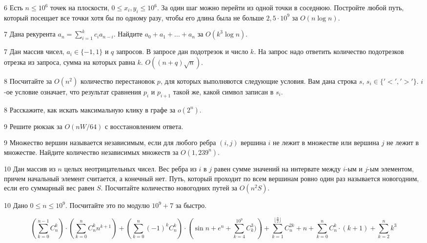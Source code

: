 \documentclass{article}
\begin{document}
\begin{tasks}
		\item[6] Есть $n \leq 10^6$ точек на плоскости, $0 \leq x_i, y_i \leq 10^6$. За один шаг можно перейти из одной точки в соседнюю. Постройте любой путь, который посещает все точки хотя бы по одному разу, чтобы его длина была не больше $2,5 \cdot 10^9$ за $O(n \log n)$.

		\item[7] Дана рекурента $a_n = \sum_{i=1}^{k} c_i a_{n - i}$. Найдите $a_0 + a_1 + ... + a_n$ за $O(k^3 \log n)$.

		\item[7] Дан массив чисел, $a_i \in \{-1, 1 \}$ и $q$ запросов. В запросе дан подотрезок и число $k$. На запрос надо ответить количество подотрезков отрезка из запроса, сумма на которых равна $k$. $O((n + q) \sqrt n)$.

		\item[8] Посчитайте за $O(n^2)$ количество перестановок $p$, для которых выполняются следующие условия. Вам дана строка $s$, $s_i \in \{ '<', '>' \}$. $i$-ое условие означает, что результат сравнения $p_i$ и $p_{i +1}$ такой же, какой символ записан в $s_i$.

		\item[8] Расскажите, как искать максимальную клику в графе за $o(2^n)$.

		\item[9] Решите рюкзак за $O(nW / 64)$ с восстановлением ответа.
		
		\item[9] Множество вершин называется независимым, если для любого ребра $(i, j)$ вершина $i$ не лежит в множестве или вершина $j$ не лежит в множестве. Найдите количество независимых множеств за $O(1,239^n)$.
		
		\item[10] Дан массив из $n$ целых неотрицательных чисел. Вес ребра из $i$ в $j$ равен сумме значений на интервате между $i$-ым и $j$-ым элементом, причем начальный элемент считается, а конечный нет. Путь, который проходит по всем вершинам ровно один раз называется новогодним, если его суммарный вес равен $S$. Посчитайте количество новогодних путей за $O(n^2 S)$.
		
		
		\item[10] Дано $0 \leq n \leq 10^9$. Посчитайте это по модулю $10^9 + 7$ за быстро.
		
		\[
		\left( \sum_{k=0}^{n-1} C_n^k \right) \cdot
		\left ( \sum_{k=0}^n C_n^k n^{k+1} \right) +
		\left( \sum_{k=0}^{n} (-1)^k C_n^k \right) \cdot
		\left( \sin n + e^n + \sum_{k=4}^{10^9} C_k^3) \right) +
		\sum_{k=1}^{\lfloor \frac{n}{2} \rfloor} C_n^{2k} + n +
		\sum_{k=0}^n C_n^k \cdot (k + 1) +
		\sum_{k=2}^n k^3
		\]

	\end{tasks}
\end{document}
